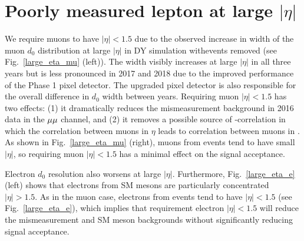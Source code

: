 \chapter{Poorly measured lepton \ad at large $|\eta|$}
\label{large_eta}

We require muons to have $|\eta|<1.5$ due to the observed increase in width of the muon $d_0$ distribution at large $|\eta|$ in DY simulation with\ztautaull events removed (see Fig.~\ref{large_eta_mu} (left)). The width visibly increases at large $|\eta|$ in all three years but is less pronounced in 2017 and 2018 due to the improved performance of the Phase 1 pixel detector. The upgraded pixel detector is also responsible for the overall difference in $d_0$ width between years. Requiring muon $|\eta|< 1.5$ has two effects: (1) it dramatically reduces the mismeasurement background in 2016 data in the ${\mu}{\mu}$ channel, and (2) it removes a possible source of \ada-\adb correlation in which the correlation between muons in $\eta$ leads to correlation between muons in \ad. As shown in Fig.~\ref{large_eta_mu} (right), muons from \stoptolb events tend to have small $|\eta|$, so requiring muon $|\eta|< 1.5$ has a minimal effect on the signal acceptance.



Electron $d_0$ resolution also worsens at large $|\eta|$. Furthermore, Fig.~\ref{large_eta_e} (left) shows that electrons from SM mesons are particularly concentrated $|\eta|>1.5$. As in the muon case, electrons from \stoptolb events tend to have $|\eta|<1.5$ (see Fig.~\ref{large_eta_e}), which implies that requirement electron $|\eta|<1.5$ will reduce the mismeasurement and SM meson backgrounds without significantly reducing signal acceptance.



\pagebreak